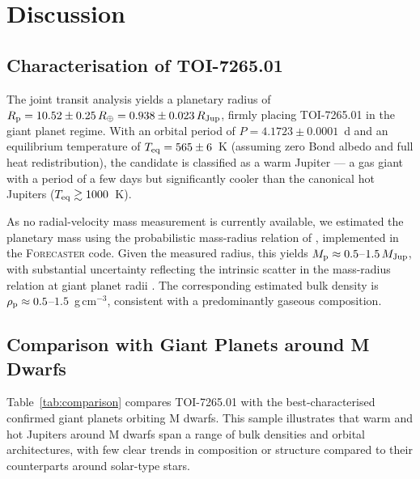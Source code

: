 \documentclass[fleqn,usenatbib]{mnras}
\newcommand{\Mjup}{M_{\rm Jup}}
\newcommand{\Rjup}{R_{\rm Jup}}
\newcommand{\Rearth}{R_{\oplus}}
\begin{document}
\section{Discussion}
\label{sec:discussion}

\subsection{Characterisation of TOI-7265.01}
\label{sec:characterisation}

The joint transit analysis yields a planetary radius of $R_{\rm p} = 10.52 \pm 0.25\,\Rearth = 0.938 \pm 0.023\,\Rjup$, firmly placing TOI-7265.01 in the giant planet regime. With an orbital period of $P = 4.1723 \pm 0.0001$~d and an equilibrium temperature of $T_{\rm eq} = 565 \pm 6$~K (assuming zero Bond albedo and full heat redistribution), the candidate is classified as a warm Jupiter — a gas giant with a period of a few days but significantly cooler than the canonical hot Jupiters ($T_{\rm eq} \gtrsim 1000$~K).

As no radial-velocity mass measurement is currently available, we estimated the planetary mass using the probabilistic mass-radius relation of \citet{chenkipping2017}, implemented in the \textsc{Forecaster} code. Given the measured radius, this yields $M_{\rm p} \approx 0.5$--$1.5\,\Mjup$, with substantial uncertainty reflecting the intrinsic scatter in the mass-radius relation at giant planet radii \citep{mullerhelled2024}. The corresponding estimated bulk density is $\rho_{\rm p} \approx 0.5$--$1.5$~g\,cm$^{-3}$, consistent with a predominantly gaseous composition.

\subsection{Comparison with Giant Planets around M Dwarfs}
\label{sec:comparison}

Table~\ref{tab:comparison} compares TOI-7265.01 with the best-characterised confirmed giant planets orbiting M dwarfs. This sample illustrates that warm and hot Jupiters around M dwarfs span a range of bulk densities and orbital architectures, with few clear trends in composition or structure compared to their counterparts around solar-type stars.
\end{document}

